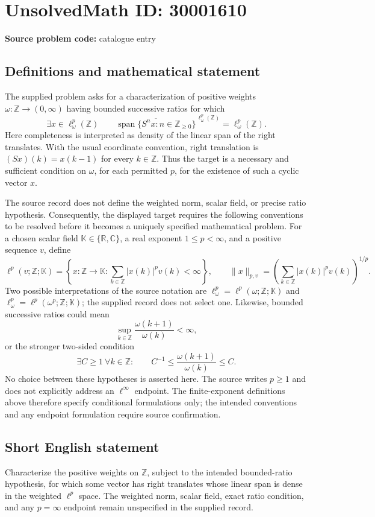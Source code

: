 \documentclass[11pt]{article}
\newcommand{\Z}{\mathbb{Z}}
\newcommand{\R}{\mathbb{R}}
\newcommand{\C}{\mathbb{C}}
\begin{document}
\section*{UnsolvedMath ID: 30001610}
\textbf{Source problem code:} catalogue entry
\subsection{Definitions and mathematical statement}
The supplied problem asks for a characterization of positive weights \(\omega:\Z\to(0,\infty)\) having bounded successive ratios for which
\[
\exists x\in\ell^p_\omega(\Z)\qquad
\overline{\operatorname{span}\{S^n x:n\in\Z_{\geq0}\}}^{\,\ell^p_\omega(\Z)}
=\ell^p_\omega(\Z).
\]
Here completeness is interpreted as density of the linear span of the right translates. With the usual coordinate convention, right translation is \((Sx)(k)=x(k-1)\) for every \(k\in\Z\). Thus the target is a necessary and sufficient condition on \(\omega\), for each permitted \(p\), for the existence of such a cyclic vector \(x\).

The source record does not define the weighted norm, scalar field, or precise ratio hypothesis. Consequently, the displayed target requires the following conventions to be resolved before it becomes a uniquely specified mathematical problem. For a chosen scalar field \(\mathbb K\in\{\R,\C\}\), a real exponent \(1\leq p<\infty\), and a positive sequence \(v\), define
\[
\ell^p(v;\Z;\mathbb K)
=\left\{x:\Z\to\mathbb K:
\sum_{k\in\Z}|x(k)|^p v(k)<\infty\right\},
\qquad
\|x\|_{p,v}=\left(\sum_{k\in\Z}|x(k)|^p v(k)\right)^{1/p}.
\]
Two possible interpretations of the source notation are \(\ell^p_\omega=\ell^p(\omega;\Z;\mathbb K)\) and \(\ell^p_\omega=\ell^p(\omega^p;\Z;\mathbb K)\); the supplied record does not select one. Likewise, bounded successive ratios could mean
\[
\sup_{k\in\Z}\frac{\omega(k+1)}{\omega(k)}<\infty,
\]
or the stronger two-sided condition
\[
\exists C\geq1\ \forall k\in\Z:\qquad
C^{-1}\leq\frac{\omega(k+1)}{\omega(k)}\leq C.
\]
No choice between these hypotheses is asserted here. The source writes \(p\geq1\) and does not explicitly address an \(\ell^\infty\) endpoint. The finite-exponent definitions above therefore specify conditional formulations only; the intended conventions and any endpoint formulation require source confirmation.
\subsection{Short English statement}
Characterize the positive weights on \(\Z\), subject to the intended bounded-ratio hypothesis, for which some vector has right translates whose linear span is dense in the weighted \(\ell^p\) space. The weighted norm, scalar field, exact ratio condition, and any \(p=\infty\) endpoint remain unspecified in the supplied record.
\end{document}
